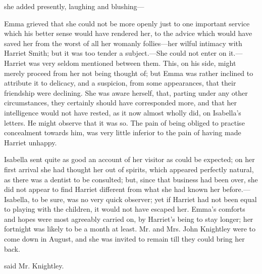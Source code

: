 

 she added presently, laughing and blushing---

Emma grieved that she could not be more openly just to one important service which his better sense would have rendered her, to the advice which would have saved her from the worst of all her womanly follies---her wilful intimacy with Harriet Smith; but it was too tender a subject.---She could not enter on it.---Harriet was very seldom mentioned between them. This, on his side, might merely proceed from her not being thought of; but Emma was rather inclined to attribute it to delicacy, and a suspicion, from some appearances, that their friendship were declining. She was aware herself, that, parting under any other circumstances, they certainly should have corresponded more, and that her intelligence would not have rested, as it now almost wholly did, on Isabella's letters. He might observe that it was so. The pain of being obliged to practise concealment towards him, was very little inferior to the pain of having made Harriet unhappy.

Isabella sent quite as good an account of her visitor as could be expected; on her first arrival she had thought her out of spirits, which appeared perfectly natural, as there was a dentist to be consulted; but, since that business had been over, she did not appear to find Harriet different from what she had known her before.---Isabella, to be sure, was no very quick observer; yet if Harriet had not been equal to playing with the children, it would not have escaped her. Emma's comforts and hopes were most agreeably carried on, by Harriet's being to stay longer; her fortnight was likely to be a month at least. Mr. and Mrs. John Knightley were to come down in August, and she was invited to remain till they could bring her back.

 said Mr. Knightley. 

